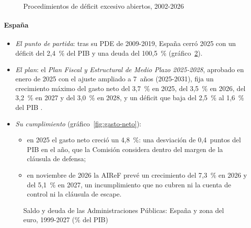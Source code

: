 \documentclass[11pt]{article}
\begin{document}
\begin{figure}[H]
\centering
\caption{Procedimientos de déficit excesivo abiertos, 2002-2026}\label{fig:pde}
\end{figure}

\paragraph{España}

\begin{itemize}
\item \emph{El punto de partida}: tras su PDE de 2009-2019, España cerró 2025 con un déficit del 2,4~\% del PIB y una deuda del 100,5~\% (gráfico~\ref{fig:deficit-deuda})\nocite{Eurostat2026Notificacion}.
\item \emph{El plan}: el \emph{Plan Fiscal y Estructural de Medio Plazo 2025-2028}, aprobado en enero de 2025 con el ajuste ampliado a 7~años (2025-2031), fija un crecimiento máximo del gasto neto del 3,7~\% en 2025, del 3,5~\% en 2026, del 3,2~\% en 2027 y del 3,0~\% en 2028, y un déficit que baja del 2,5~\% al 1,6~\% del PIB\nocite{Consejo2025PlanEspana} .
\item \emph{Su cumplimiento} (gráfico~\ref{fig:gasto-neto}):
  \begin{itemize}
  \item en 2025 el gasto neto creció un 4,8~\%: una desviación de 0,4~puntos del PIB en el año, que la Comisión considera dentro del margen de la cláusula de defensa\nocite{Consejo2026REPEspana};
  \item en noviembre de 2026 la AIReF prevé un crecimiento del 7,3~\% en 2026 y del 5,1~\% en 2027, un incumplimiento que no cubren ni la cuenta de control ni la cláusula de escape\nocite{AIReF2026Lineas}.
  \end{itemize}
\end{itemize}

\begin{figure}[H]
\centering
\caption{Saldo y deuda de las Administraciones Públicas: España y zona del euro, 1999-2027 (\% del PIB)}\label{fig:deficit-deuda}
\end{figure}
\end{document}
